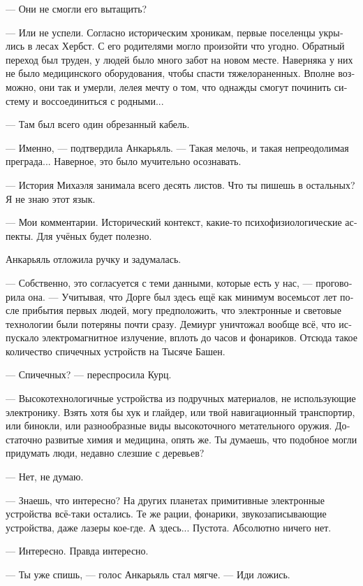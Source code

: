 \documentclass[a4paper,12pt,fleqn]{book}\usepackage{polyglossia}\setdefaultlanguage[babelshorthands=true]{russian}\setotherlanguage{english}\defaultfontfeatures{Ligatures=TeX,Mapping=tex-text}\usepackage{xcolor}\newcommand{\ml}[3]{#2}
\begin{document}
--- Они не смогли его вытащить?

--- Или не успели.
Согласно историческим хроникам, первые поселенцы укрылись в лесах Хербст.
С его родителями могло произойти что угодно.
Обратный переход был труден, у людей было много забот на новом месте.
Наверняка у них не было медицинского оборудования, чтобы спасти тяжелораненных.
Вполне возможно, они так и умерли, лелея мечту о том, что однажды смогут починить систему и воссоединиться с родными...

--- Там был всего один обрезанный кабель.

--- Именно, --- подтвердила Анкарьяль.
--- Такая мелочь, и такая непреодолимая преграда...
Наверное, это было мучительно осознавать.

--- История Михаэля занимала всего десять листов.
Что ты пишешь в остальных?
Я не знаю этот язык.

--- Мои комментарии.
Исторический контекст, какие-то психофизиологические аспекты.
Для учёных будет полезно.

Анкарьяль отложила ручку и задумалась.

--- Собственно, это согласуется с теми данными, которые есть у нас, --- проговорила она.
--- Учитывая, что Дорге был здесь ещё как минимум восемьсот лет после прибытия первых людей, могу предположить, что электронные и световые технологии были потеряны почти сразу.
Демиург уничтожал вообще всё, что испускало электромагнитное излучение, вплоть до часов и фонариков.
Отсюда такое количество спичечных устройств на Тысяче Башен.

--- Спичечных? --- переспросила Курц.

--- Высокотехнологичные устройства из подручных материалов, не использующие электронику.
Взять хотя бы хук и глайдер, или твой навигационный транспортир, или бинокли, или разнообразные виды высокоточного метательного оружия.
Достаточно развитые химия и медицина, опять же.
Ты думаешь, что подобное могли придумать люди, недавно слезшие с деревьев?

--- Нет, не думаю.

--- Знаешь, что интересно?
На других планетах примитивные электронные устройства всё-таки остались.
Те же рации, фонарики, звукозаписывающие устройства, даже лазеры кое-где.
А здесь...
Пустота.
Абсолютно ничего нет.

--- Интересно.
Правда интересно.

--- Ты уже спишь, --- голос Анкарьяль стал мягче.
--- Иди ложись.
\end{document}
